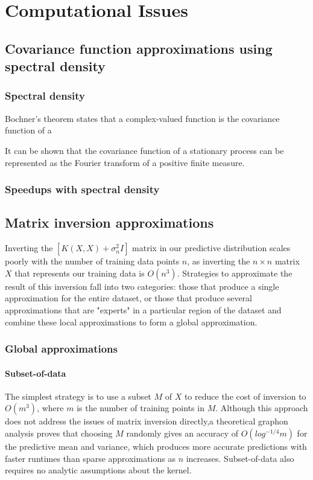 \section{Computational Issues}

\subsection{Covariance function approximations using spectral density}

\subsubsection{Spectral density \cite{gp-ml}}
Bochner's theorem states that a complex-valued function is the covariance function of a 

It can be shown \cite{Gikhman2004-wc} that the covariance function of a stationary process can be represented as the Fourier transform of a positive finite measure.

\subsubsection{Speedups with spectral density \cite{foreman-mackay}}


\subsection{Matrix inversion approximations \cite{big-data}}
Inverting the $[K(X,X) + \sigma^2_nI]$ matrix in our predictive distribution scales poorly with the number of training data points $n$, as inverting the $n \times n$ matrix $X$ that represents our training data is $O(n^3)$. Strategies to approximate the result of this inversion fall into two categories: those that produce a single approximation for the entire dataset, or those that produce several approximations that are "experts" in a particular region of the dataset and combine these local approximations to form a global approximation.

\subsubsection{Global approximations}

\paragraph{Subset-of-data}
The simplest strategy is to use a subset $M$ of $X$ to reduce the cost of inversion to $O(m^3)$, where $m$ is the number of training points in $M$. Although this approach does not address the issues of matrix inversion directly,a theoretical graphon analysis proves that choosing $M$ randomly gives an accuracy of $O(log^{-1/4}m)$ for the predictive mean and variance, which produces more accurate predictions with faster runtimes than sparse approximations as $n$ increases. \cite{random-subsampling} Subset-of-data also requires no analytic assumptions about the kernel.

